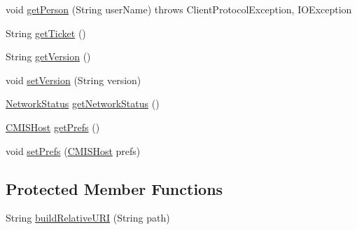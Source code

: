 \begin{DoxyCompactItemize}
\item 
void \hyperlink{classcom_1_1zia_1_1freshdocs_1_1cmis_1_1_c_m_i_s_aca346db2685c32f8bf72cde9144df98e}{get\-Person} (String user\-Name)  throws Client\-Protocol\-Exception, I\-O\-Exception
\item 
String \hyperlink{classcom_1_1zia_1_1freshdocs_1_1cmis_1_1_c_m_i_s_ac765a572fc4ba5b6e0fbb42a6a21990d}{get\-Ticket} ()
\item 
String \hyperlink{classcom_1_1zia_1_1freshdocs_1_1cmis_1_1_c_m_i_s_a89c4cd55e630415663b68fc2f99ad245}{get\-Version} ()
\item 
void \hyperlink{classcom_1_1zia_1_1freshdocs_1_1cmis_1_1_c_m_i_s_a80c1396034e8e1945765215b5467e97a}{set\-Version} (String version)
\item 
\hyperlink{enumcom_1_1zia_1_1freshdocs_1_1model_1_1_constants_1_1_network_status}{Network\-Status} \hyperlink{classcom_1_1zia_1_1freshdocs_1_1cmis_1_1_c_m_i_s_ac9d47c1d05bbb5368b0c62dac17b9ca5}{get\-Network\-Status} ()
\item 
\hyperlink{classcom_1_1zia_1_1freshdocs_1_1preference_1_1_c_m_i_s_host}{C\-M\-I\-S\-Host} \hyperlink{classcom_1_1zia_1_1freshdocs_1_1cmis_1_1_c_m_i_s_a6228d0d0236526a96a4cfc76723ab4dc}{get\-Prefs} ()
\item 
void \hyperlink{classcom_1_1zia_1_1freshdocs_1_1cmis_1_1_c_m_i_s_a5bdc1a91c33bb6a721f504fdb03fc326}{set\-Prefs} (\hyperlink{classcom_1_1zia_1_1freshdocs_1_1preference_1_1_c_m_i_s_host}{C\-M\-I\-S\-Host} prefs)
\end{DoxyCompactItemize}
\subsection*{Protected Member Functions}
\begin{DoxyCompactItemize}
\item 
String \hyperlink{classcom_1_1zia_1_1freshdocs_1_1cmis_1_1_c_m_i_s_a6c56d87a1e0c0e8a7d9711f13bf4cec9}{build\-Relative\-U\-R\-I} (String path)
\end{DoxyCompactItemize}
